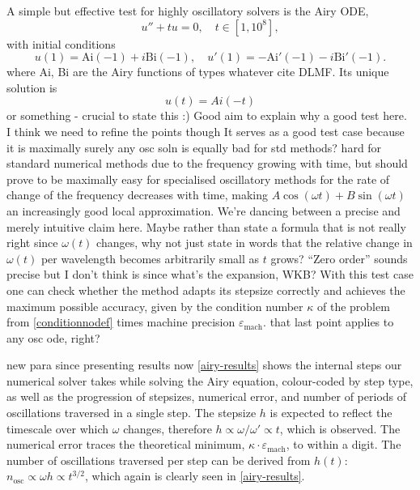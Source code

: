 \documentclass[10pt]{article}
\newcommand{\be}{\begin{equation}}
\newcommand{\ee}{\end{equation}}
\newcommand{\om}{\omega}
\newcommand{\AB}[1]{{\color{orange}#1}}
\begin{document}
A simple but effective test for highly oscillatory solvers is the Airy ODE,
\be
u'' + tu = 0, \quad t \in [1, 10^8], 
\ee
with initial conditions
\be
u(1) = \text{Ai}(-1) + i\text{Bi}(-1), \quad u'(1) = - \text{Ai}'(-1) -i\text{Bi}'(-1).
\ee
\AB{where Ai, Bi are the Airy functions of types whatever cite DLMF.}
\AB{Its unique solution is $$u(t) = Ai(-t)$$ or something - crucial to state this :)}
\AB{Good aim to explain why a good test here. I think we need to refine the
  points though}
It serves as a good test case because it is maximally
\AB{surely any osc soln is equally bad for std methods?}
hard for standard
numerical methods due to the frequency growing with time, but should prove to
be maximally easy for specialised oscillatory methods for the rate of change of
the frequency decreases with time, making $A\cos(\om t) + B\sin(\om t)$
an increasingly good local approximation.
\AB{We're dancing between a precise and merely intuitive claim here.
  Maybe rather than state a formula that is not really right since $\om(t)$
  changes, why not just state in words that the relative
  change in $\omega(t)$ per wavelength becomes arbitrarily small as $t$ grows?
  ``Zero order'' sounds precise but I don't think is since what's the expansion, WKB?}
With this test
case one can check whether the method adapts its stepsize correctly and
achieves the maximum possible accuracy, given by the condition number $\kappa$ of
the problem from \cref{conditionnodef} times machine precision $\varepsilon_{\text{mach}}$.
\AB{that last point applies to any osc ode, right?}


\AB{new para since presenting results now}
\cref{airy-results} shows the
internal steps our numerical solver takes while solving the Airy equation,
colour-coded by step type, as well as the progression of stepsizes, numerical
error, and number of periods of oscillations traversed in a single step. The
stepsize $h$ is expected to reflect the timescale over which $\om$ changes,
therefore $h \propto \om/\om' \propto t$, which is observed. The numerical
error traces the theoretical minimum, $\kappa \cdot \varepsilon_{\text{mach}}$, to
within a digit. The number of oscillations traversed per step can be derived
from $h(t)$: $n_{\text{osc}} \propto \om h \propto t^{3/2}$, which again is
clearly seen in \cref{airy-results}.
\end{document}
